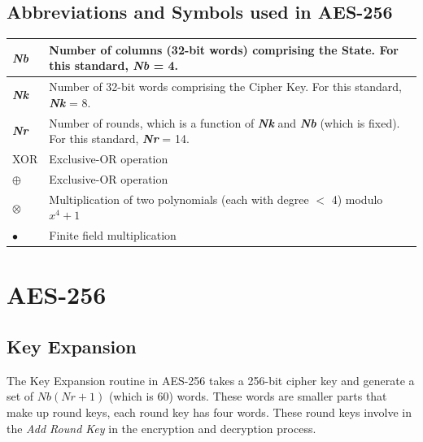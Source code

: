 \documentclass[a4paper, 10pt]{article}
\begin{document}
\begin{multicols}{2}
            \subsection{Abbreviations and Symbols used in AES-256}
                    \setlength{\tabcolsep}{5pt} %
                    \renewcommand{\arraystretch}{1.5} %
                    \noindent
                        \begin{center}
				\begin{tabular}{m{1cm} m{7cm}}
                            \textbf{\textit{Nb}} & Number of columns (32-bit words) comprising the State. For this
                            standard, \textbf{\textit{Nb}} = 4.\\
                            \hline
                            \textbf{\textit{Nk}} & Number of 32-bit words comprising the Cipher Key. For this standard, \textbf{\textit{Nk}} = 8.\\
                            \hline
                            \textbf{\textit{Nr}} & Number of rounds, which is a function of \textbf{\textit{Nk}} and \textbf{\textit{Nb}} (which is
                            fixed). For this standard, \textbf{\textit{Nr}} = 14.\\
                            \hline
                            XOR & Exclusive-OR operation\\
                            \hline
                            $\oplus$ & Exclusive-OR operation\\
                            \hline
                            $\otimes$ & Multiplication of two polynomials (each with degree $<$ 4) modulo $x^{4}+1$\\
                            \hline
                            $\bullet$ & Finite field multiplication\\
                        \end{tabular}
				\end{center}

        \section{AES-256}
            \subsection{Key Expansion}
                The Key Expansion routine in AES-256 takes a 256-bit cipher key and generate a set of $Nb(Nr+1)$ (which is 60) words. These words are smaller parts that make up round keys, each round key has four words. These round keys involve in the \textit{Add Round Key} in the encryption and decryption process.


\end{multicols}
\end{document}
